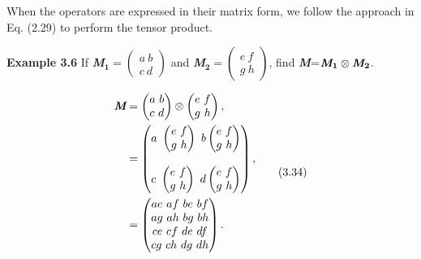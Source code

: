 \documentclass{article}
\begin{document}
When the operators are expressed in their matrix form, we follow the approach in Eq. (2.29)
to perform the tensor product.

\textbf{Example 3.6} If \textbf{\textit{M}}$_{\textbf{1}}=\begin{pmatrix}
    a \ b \\ c \ d
\end{pmatrix}$ and \textbf{\textit{M}}$_{\textbf{2}}=\begin{pmatrix}
    e \ f \\ g \ h
\end{pmatrix}$, find \textit{\textbf{M}}=$\textit{\textbf{M}}_{\textbf{1}}\otimes\textit{\textbf{M}}_{\textbf{2}}$.

\begin{align} \label{eq 3.34}
    \begin{split}
        \textit{\textbf{M}} &= \begin{pmatrix}
            a \ b \\ c \ d
        \end{pmatrix}\otimes
        \begin{pmatrix}
            e\ f\\ g\ h
        \end{pmatrix},\\
        &=\begin{pmatrix}
            a \ \begin{pmatrix}
                e\ f\\ g\ h
            \end{pmatrix} \ b \begin{pmatrix}
                e\ f\\g\ h
            \end{pmatrix}\\
            \ \\
            c \ \begin{pmatrix}
                e\ f\\ g\ h
            \end{pmatrix} \ d \begin{pmatrix}
                e\ f\\g\ h
            \end{pmatrix}
        \end{pmatrix},\\
        &= \begin{pmatrix}
            ae\ af\ be\ bf\\
            ag\ ah\ bg\ bh\\
            ce\ cf\ de\ df\\
            cg\ ch\ dg\ dh
        \end{pmatrix}.
    \end{split} \tag{3.34}
\end{align}
\end{document}
